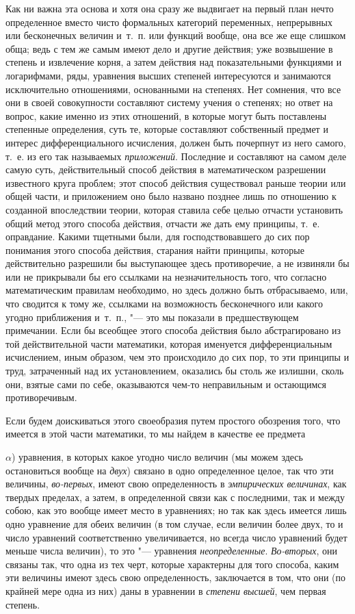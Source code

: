 Как ни важна эта основа и хотя она сразу же выдвигает на первый план нечто
определенное вместо чисто формальных категорий переменных, непрерывных или
бесконечных величин и~т.~п. или функций вообще, она все же еще слишком
обща; ведь с тем же самым имеют дело и другие действия; уже возвышение в
степень и извлечение корня, а затем действия над показательными функциями и
логарифмами, ряды, уравнения высших степеней интересуются и занимаются
исключительно отношениями, основанными на степенях. Нет сомнения, что все
они в своей совокупности составляют систему учения о степенях; но ответ на
вопрос, какие именно из этих отношений, в которые могут быть поставлены
степенные определения, суть те, которые составляют собственный предмет и
интерес дифференциального исчисления, должен быть почерпнут из него
самого, т.~е. из его так называемых {\em приложений}.
Последние и составляют на самом деле самую суть, действительный способ
действия в математическом разрешении известного круга проблем; этот способ
действия существовал раньше теории или общей части, и приложением оно было
названо позднее лишь по отношению к созданной впоследствии теории, которая
ставила себе целью отчасти установить общий метод этого способа действия,
отчасти же дать ему принципы, т.~е. оправдание. Какими тщетными были, для
господствовавшего до сих пор понимания этого способа действия, старания
найти принципы, которые действительно разрешили бы выступающее здесь
противоречие, а не извиняли бы или не прикрывали бы его ссылками на
незначительность того, что согласно математическим правилам необходимо, но
здесь должно быть отбрасываемо, или, что сводится к тому же, ссылками на
возможность бесконечного или какого угодно приближения и~т.~п., "--- это мы
показали в предшествующем примечании. Если бы всеобщее этого способа
действия было абстрагировано из той действительной части математики,
которая именуется дифференциальным исчислением, иным образом, чем это
происходило до сих пор, то эти принципы и труд, затраченный над их
установлением, оказались бы столь же излишни, сколь они, взятые сами по
себе, оказываются чем-то неправильным и остающимся противоречивым.

Если будем доискиваться этого своеобразия путем простого обозрения того, что
имеется в этой части математики, то мы найдем в качестве ее предмета

$\alpha $) уравнения, в которых какое угодно число величин (мы можем здесь
остановиться вообще на {\em двух}) связано в одно
определенное целое, так что эти величины,
{\em во-первых}, имеют свою определенность в
{\em эмпирических величинах}, как твердых пределах, а
затем, в определенной связи как с последними, так и между собою, как это
вообще имеет место в уравнениях; но так как здесь имеется лишь одно
уравнение для обеих величин (в том случае, если величин более двух, то и
число уравнений соответственно увеличивается, но всегда число уравнений
будет меньше числа величин), то это "--- уравнения {\em неопределенные}.
{\em Во-вторых}, они связаны так, что одна из тех черт,
которые характерны для того способа, каким эти величины имеют здесь свою
определенность, заключается в том, что они (по крайней мере одна из них)
даны в уравнении в {\em степени высшей}, чем первая степень.

